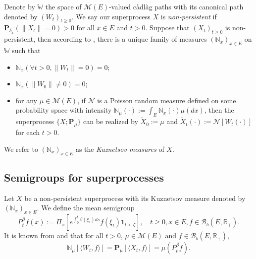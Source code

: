\documentclass[UTF8]{pkuthss}
\theoremstyle{plain}
\theoremstyle{definition}
\numberwithin{equation}{section}
\begin{document}
\begin{comment}
    Notice that the branching mechanism $\psi$ can be extended into a map from $E \times \mathbb C_+$ to $\mathbb C$ using \eqref{eq: branching mechanism}.
    Define
\begin{equation}
    \psi'(x,z):= - \beta(x) + 2\alpha(x) z + \int_{(0,\infty)} (1-e^{-zy})y\pi(x,dy),
    \quad x\in E, z\in \mathbb C_+.
\end{equation}
    Then according to Lemma \ref{lem: extension lemma for branching mechanism}, for each $x \in E$, $z \mapsto \psi(x,z)$ is a holomorphic function on $\mathbb C_+^0$ with derivative $z \mapsto \psi'(x,z)$.
    Define $\psi_0(x,z) := \psi(x,z)+ \beta(x)z $ and $\psi'_0(x,z) := \psi'(x,z) + \beta(x)$.
\end{comment}

    Denote by $\mathbb W$ the space of $\mathcal M(E)$-valued c\`{a}dl\`{a}g paths with its canonical path denoted by $(W_t)_{t\geq 0}$.
    We say our superprocess $X$ is \emph{non-persistent} if $\mathbf P_{\delta_x}(\|X_t\|= 0) > 0$ for all $x\in E$ and $t> 0$.
    Suppose that $(X_t)_{t\geq 0}$ is non-persistent, then according to \cite[Section 8.4]{Li2011MeasureValued}, there is a unique family of measures $(\mathbb N_x)_{x\in E}$ on $\mathbb W$ such that
\begin{itemize}
\item
    $\mathbb N_x (\forall t > 0, \|W_t\|=0) =0$;
\item
    $\mathbb N_x(\|W_0 \|\neq 0) = 0$;
\item
    for any $\mu \in \mathcal M(E)$, if $\mathcal N$ is a Poisson random measure defined on some probability space
    with intensity $\mathbb N_\mu(\cdot):= \int_E \mathbb N_x(\cdot )\mu(dx)$,
    then the superprocess $\{X;\mathbf P_\mu\}$ can be realized by $\widetilde X_0 := \mu$ and $\widetilde X_t(\cdot) := \mathcal N[W_t(\cdot)]$ for each $t>0$.
\end{itemize}
    We refer to $(\mathbb N_x)_{x\in E}$ as the \emph{Kuznetsov measures} of $X$.
\subsection{{Semigroups for superprocesses}}
\label{sec: definition of vf}
    Let $X$ be a non-persistent superprocess with its Kuznetsov measure denoted by $(\mathbb N_x)_{x\in E}$.
    We define the mean semigroup
\begin{equation}
    P_t^{\beta} f(x)
    := \Pi_{x}[e^{\int_0^t \beta(\xi_s)ds}f(\xi_t) \mathbf 1_{t< \zeta}],
    \quad t\geq 0, x\in E, f\in \mathcal B_b(E,\mathbb R_+).
\end{equation}
    It is known from \cite[Proposition 2.27]{Li2011MeasureValued} and \cite[Theorem 2.7]{Kyprianou2014Fluctuations} that for all $t > 0$, $\mu \in \mathcal M(E)$ and $f\in \mathcal B_b(E,\mathbb R_+)$,
\begin{equation}
\label{eq: mean formula for superprocesses}
   \mathbb N_{\mu}[\langle W_t, f\rangle]    
   =\mathbf P_{\mu}[\langle X_t, f\rangle]
   =\mu(P^{\beta}_t f).
\end{equation}
\end{document}
